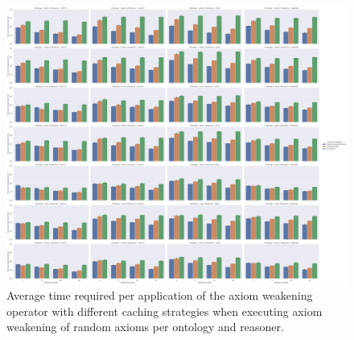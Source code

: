 \begin{figure}[ht]
    \begin{widepage}
      \centering
      \includegraphics[width=\textwidth]{resources/time-cache-ontology-reasoner-bar.png}
    \end{widepage}
    \caption{Average time required per application of the axiom weakening operator with different caching strategies when executing axiom weakening of random axioms per ontology and reasoner.}
\end{figure}
